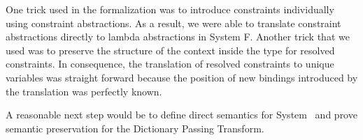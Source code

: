 \noindent One trick used in the formalization was to introduce constraints individually using constraint abstractions. As a result, we were able to translate constraint abstractions directly to lambda abstractions in System F. Another trick that we used was to preserve the structure of the context inside the type for resolved constraints. In consequence, the translation of resolved constraints to unique variables was straight forward because the position of new bindings introduced by the translation was perfectly known.   

\noindent A reasonable next step would be to define direct semantics for System \Fo\ and prove semantic preservation for the Dictionary Passing Transform. 